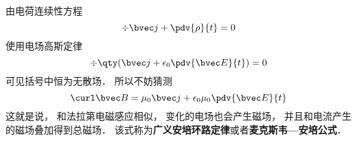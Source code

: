 由电荷连续性方程
\begin{equation}
\div \bvec j + \pdv{\rho}{t} = 0
\end{equation}
使用电场高斯定律
\begin{equation}
\div \qty(\bvec j + \epsilon_0\pdv{\bvec E}{t}) = 0
\end{equation}
可见括号中恒为无散场． 所以不妨猜测
\begin{equation}
\curl\bvec B = \mu_0\bvec j + \epsilon_0\mu_0\pdv{\bvec E}{t}
\end{equation}
这就是说， 和法拉第电磁感应相似， 变化的电场也会产生磁场， 并且和电流产生的磁场叠加得到总磁场． 该式称为\textbf{广义安培环路定律}或者\textbf{麦克斯韦—安培公式}．

